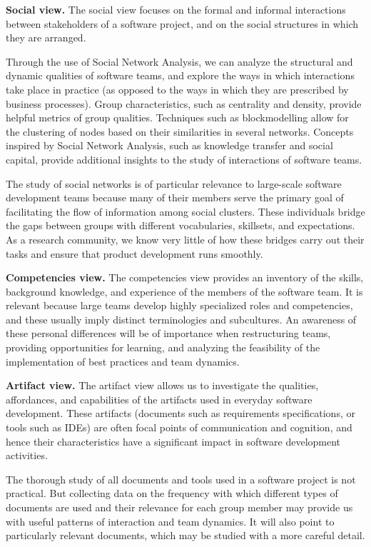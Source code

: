 \textbf{Social view.} The social view focuses on the formal and informal interactions between stakeholders of a software project, and on the social structures in which they are arranged.

Through the use of Social Network Analysis, we can analyze the structural and dynamic qualities of software teams, and explore the ways in which interactions take place in practice (as opposed to the ways in which they are prescribed by business processes). Group characteristics, such as centrality and density, provide helpful metrics of group qualities. Techniques such as blockmodelling allow for the clustering of nodes based on their similarities in several networks. Concepts inspired by Social Network Analysis, such as knowledge transfer and social capital, provide additional insights to the study of interactions of software teams.

The study of social networks is of particular relevance to large-scale software development teams because many of their members serve the primary goal of facilitating the flow of information among social clusters. These individuals bridge the gaps between groups with different vocabularies, skillsets, and expectations. As a research community, we know very little of how these bridges carry out their tasks and ensure that product development runs smoothly.

\textbf{Competencies view.} The competencies view provides an inventory of the skills, background knowledge, and experience of the members of the software team. It is relevant because large teams develop highly specialized roles and competencies, and these usually imply distinct terminologies and subcultures. An awareness of these personal differences will be of importance when restructuring teams, providing opportunities for learning, and analyzing the feasibility of the implementation of best practices and team dynamics.

\textbf{Artifact view.} The artifact view allows us to investigate the qualities, affordances, and capabilities of the artifacts used in everyday software development. These artifacts (documents such as requirements specifications, or tools such as IDEs) are often focal points of communication and cognition, and hence their characteristics have a significant impact in software development activities.

The thorough study of all documents and tools used in a software project is not practical. But collecting data on the frequency with which different types of documents are used and their relevance for each group member may provide us with useful patterns of interaction and team dynamics. It will also point to particularly relevant documents, which may be studied with a more careful detail.

